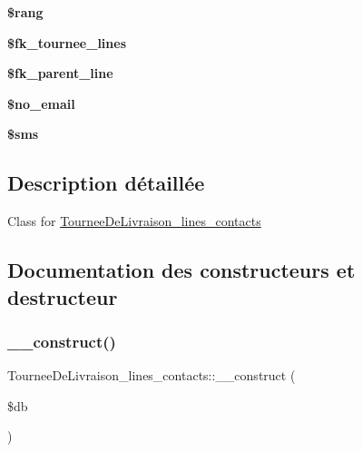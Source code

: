 \begin{DoxyCompactItemize}
\mbox{\label{classTourneeDeLivraison__lines__contacts_a4e19838645d1480d8cd76047a954c743}} 
{\bfseries \$rang}
\item 
\mbox{\label{classTourneeDeLivraison__lines__contacts_ab434326e7c20ce8bb06146a4094552d1}} 
{\bfseries \$fk\+\_\+tournee\+\_\+lines}
\item 
\mbox{\label{classTourneeDeLivraison__lines__contacts_a33d83aa9d053e37c767e96a4335cdbf8}} 
{\bfseries \$fk\+\_\+parent\+\_\+line}
\item 
\mbox{\label{classTourneeDeLivraison__lines__contacts_a21bbadc49fbde6cf01f0df3e497f3264}} 
{\bfseries \$no\+\_\+email}
\item 
\mbox{\label{classTourneeDeLivraison__lines__contacts_ad05c896e895c6225a4c856bd34887e10}} 
{\bfseries \$sms}
\end{DoxyCompactItemize}


\subsection{Description détaillée}
Class for \hyperlink{classTourneeDeLivraison__lines__contacts}{Tournee\+De\+Livraison\+\_\+lines\+\_\+contacts} 

\subsection{Documentation des constructeurs et destructeur}
\mbox{\label{classTourneeDeLivraison__lines__contacts_af635e1e913c20a8ed94b77debfb27347}} 
\subsubsection{\texorpdfstring{\+\_\+\+\_\+construct()}{\_\_construct()}}
{\footnotesize\ttfamily Tournee\+De\+Livraison\+\_\+lines\+\_\+contacts\+::\+\_\+\+\_\+construct (\begin{DoxyParamCaption}\item[{Doli\+DB}]{\$db }\end{DoxyParamCaption})}

